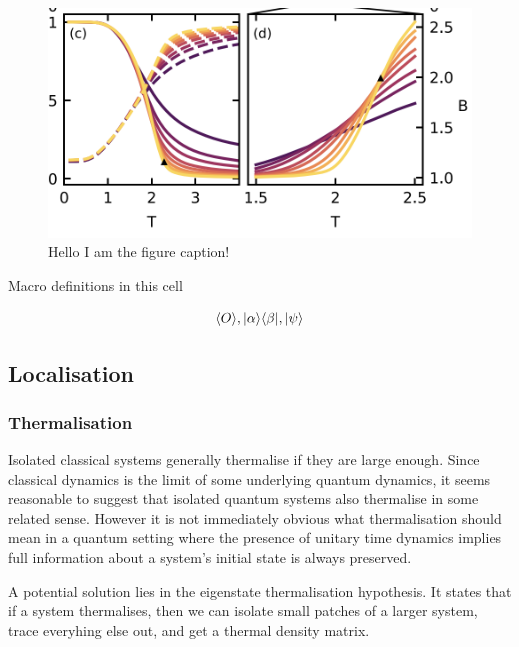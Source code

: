 \begin{figure}
\hypertarget{fig:binder}{%
\centering
\includegraphics[width=1\textwidth,height=\textheight]{figure_code/fk_chapter/binder.png}
\caption{Hello I am the figure caption!}\label{fig:binder}
}
\end{figure}

Macro definitions in this cell \[
\newcommand{\expval}[1]{\langle #1 \rangle}
\newcommand{\ket}[1]{|#1\rangle}
\newcommand{\bra}[1]{\langle#1|}
\newcommand{\op}[2]{|#1\rangle \langle#2|}
\]

\[
\expval{O}, \op{\alpha}{\beta}, \ket{\psi}
\]

\hypertarget{localisation-1}{%
\subsection{Localisation}\label{localisation-1}}

\hypertarget{thermalisation}{%
\subsubsection{Thermalisation}\label{thermalisation}}

Isolated classical systems generally thermalise if they are large
enough. Since classical dynamics is the limit of some underlying quantum
dynamics, it seems reasonable to suggest that isolated quantum systems
also thermalise in some related sense. However it is not immediately
obvious what thermalisation should mean in a quantum setting where the
presence of unitary time dynamics implies full information about a
system's initial state is always preserved.

A potential solution lies in the eigenstate thermalisation hypothesis.
It states that if a system thermalises, then we can isolate small
patches of a larger system, trace everyhing else out, and get a thermal
density matrix.

